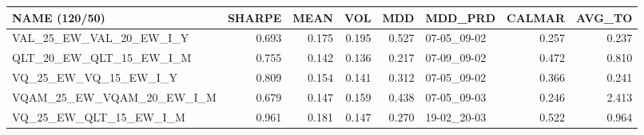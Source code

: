 \begin{tabular}{lrrrrlrr}
\toprule
NAME (120/50) & SHARPE & MEAN & VOL & MDD & MDD\_PRD & CALMAR & AVG\_TO \\
\midrule
VAL\_25\_EW\_VAL\_20\_EW\_I\_Y & 0.693 & 0.175 & 0.195 & 0.527 & 07-05\_09-02 & 0.257 & 0.237 \\
QLT\_20\_EW\_QLT\_15\_EW\_I\_M & 0.755 & 0.142 & 0.136 & 0.217 & 07-09\_09-02 & 0.472 & 0.810 \\
VQ\_25\_EW\_VQ\_15\_EW\_I\_Y & 0.809 & 0.154 & 0.141 & 0.312 & 07-05\_09-02 & 0.366 & 0.241 \\
VQAM\_25\_EW\_VQAM\_20\_EW\_I\_M & 0.679 & 0.147 & 0.159 & 0.438 & 07-05\_09-03 & 0.246 & 2.413 \\
VQ\_25\_EW\_QLT\_15\_EW\_I\_M & 0.961 & 0.181 & 0.147 & 0.270 & 19-02\_20-03 & 0.522 & 0.964 \\
\bottomrule
\end{tabular}
